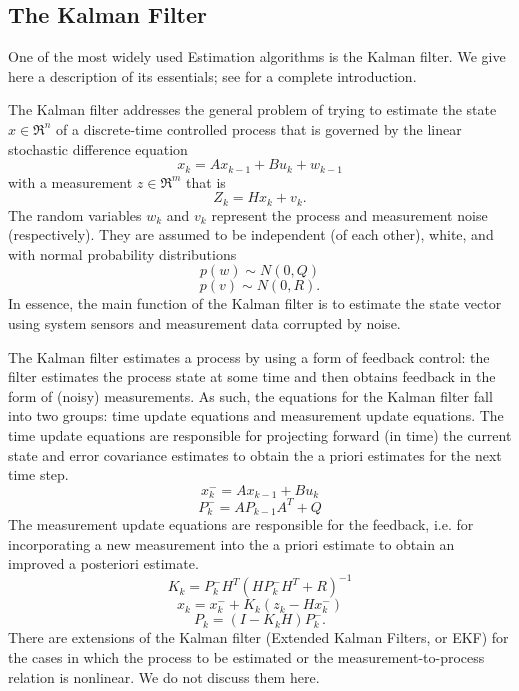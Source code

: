 \subsection{The Kalman Filter}
\label{Sskalman}

One of the most widely used Estimation algorithms is the Kalman filter. We give here a description
of its essentials; see \cite{welch} for a complete introduction.

The Kalman filter addresses the general problem of trying to estimate the state $x \in \Re^n$ 
of a discrete-time controlled process that is governed by the linear stochastic difference equation
$$x_k=Ax_{k-1} + B u_k + w_{k-1}$$
with a measurement $z \in \Re^m$ that is
$$Z_k = H x_k + v_k.$$
%
The random variables $w_k$ and $v_k$ represent the process and measurement noise
(respectively). They are assumed to be independent (of each other), white, and with
normal probability distributions
$$p(w) \sim N(0,Q) $$
$$p(v) \sim N(0,R). $$
%
In essence, the main function of the Kalman filter is to estimate the state vector 
using system sensors and measurement data  corrupted by noise.

The Kalman filter estimates a process by using a form of feedback control: the filter
estimates the process state at some time and then obtains feedback in the form of (noisy)
measurements. As such, the equations for the Kalman filter fall into two groups: time
update equations and measurement update equations. The time update equations are
responsible for projecting forward (in time) the current state and error covariance
estimates to obtain the a priori estimates for the next time step. 
$$x^-_k=A x_{k-1} + B u_k$$
$$P^-_k= AP_{k-1} A^T +Q$$
%
The measurement update equations are responsible for the feedback, i.e. for 
incorporating a new measurement into the a priori estimate to obtain an improved a posteriori estimate.
%
$$K_k=P^-_k H^T(H P^-_kH^T+R)^{-1}$$
$$ x_k=x_k^- + K_k(z_k -Hx_k^-)$$
$$P_k=(I-K_k H) P^-_k.$$
%
There are extensions of the Kalman filter (Extended Kalman Filters, or EKF)
for the cases in which the process to be estimated or the measurement-to-process
relation is nonlinear. We do not discuss them here. 

